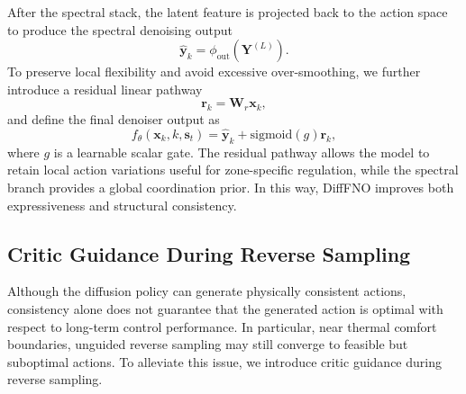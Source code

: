 \documentclass[lettersize,journal]{IEEEtran}
\theoremstyle{nonumberplain}     \theoremheaderfont{\bfseries\itshape}     \theorembodyfont{\normalfont}     \theoremseparator{:}     \theoremsymbol{\ensuremath{\blacksquare}}     \newtheorem{proof}{Proof}
\theoremstyle{plain}     \theoremheaderfont{\bfseries\itshape}     \theorembodyfont{\normalfont}     \theoremseparator{:}     \theoremsymbol{\ensuremath{\blacksquare}}     \newtheorem{remark}{Remark}
\begin{document}
After the spectral stack, the latent feature is projected back to the action space to produce the spectral denoising output
\begin{equation}
\hat{\mathbf{y}}_k = \phi_{\mathrm{out}}(\mathbf{Y}^{(L)}).
\end{equation}
To preserve local flexibility and avoid excessive over-smoothing, we further introduce a residual linear pathway
\begin{equation}
\mathbf{r}_k = \mathbf{W}_r \mathbf{x}_k,
\end{equation}
and define the final denoiser output as
\begin{equation}
f_{\theta}(\mathbf{x}_k,k,\mathbf{s}_t)
=
\hat{\mathbf{y}}_k + \mathrm{sigmoid}(g)\mathbf{r}_k,
\label{eq:final_denoiser}
\end{equation}
where $g$ is a learnable scalar gate. The residual pathway allows the model to retain local action variations useful for zone-specific regulation, while the spectral branch provides a global coordination prior. In this way, DiffFNO improves both expressiveness and structural consistency.

\subsection{Critic Guidance During Reverse Sampling}

Although the diffusion policy can generate physically consistent actions, consistency alone does not guarantee that the generated action is optimal with respect to long-term control performance. In particular, near thermal comfort boundaries, unguided reverse sampling may still converge to feasible but suboptimal actions. To alleviate this issue, we introduce critic guidance during reverse sampling.
\end{document}

